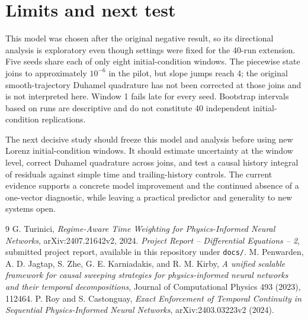 \documentclass[11pt,a4paper]{article}
\begin{document}
\section{Limits and next test}
This model was chosen after the original negative result, so its directional
analysis is exploratory even though settings were fixed for the 40-run
extension. Five seeds share each of only eight initial-condition windows.
The piecewise state joins to approximately $10^{-6}$ in the pilot, but slope
jumps reach 4; the original smooth-trajectory Duhamel quadrature has not
been corrected at those joins and is not interpreted here. Window 1 fails
late for every seed. Bootstrap intervals based on runs are descriptive and
do not constitute 40 independent initial-condition replications.

The next decisive study should freeze this model and analysis before using
new Lorenz initial-condition windows. It should estimate uncertainty at the
window level, correct Duhamel quadrature across joins, and test a causal
history integral of residuals against simple time and trailing-history
controls. The current evidence supports a concrete model improvement and
the continued absence of a one-vector diagnostic, while leaving a practical
predictor and generality to new systems open.

\begin{thebibliography}{9}
 G. Turinici, \emph{Regime-Aware Time Weighting for
Physics-Informed Neural Networks}, arXiv:2407.21642v2, 2024.
 \emph{Project Report -- Differential Equations -- 2},
submitted project report, available in this repository under \texttt{docs/}.
 M. Penwarden, A. D. Jagtap, S. Zhe, G. E. Karniadakis,
and R. M. Kirby, \emph{A unified scalable framework for causal sweeping
strategies for physics-informed neural networks and their temporal
decompositions}, Journal of Computational Physics 493 (2023), 112464.
 P. Roy and S. Castonguay, \emph{Exact Enforcement of Temporal
Continuity in Sequential Physics-Informed Neural Networks},
arXiv:2403.03223v2 (2024).
\end{thebibliography}
\end{document}
